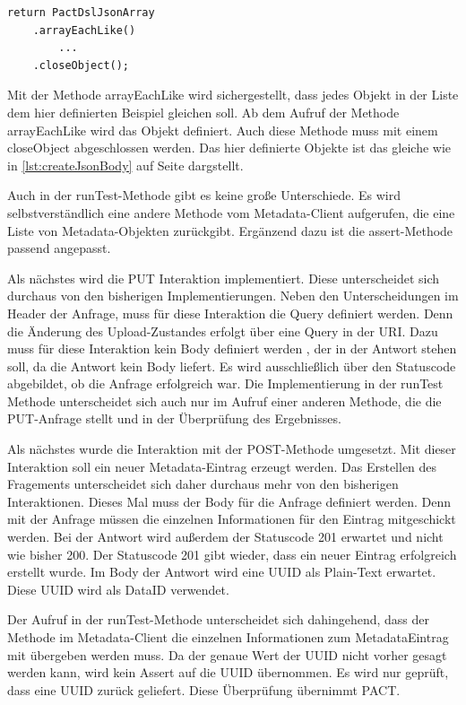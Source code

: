 \documentclass{llncs}
\begin{document}
\lstset{language = Java}
\begin{lstlisting}[caption=Test,label={lst:ArrayBody}]
return PactDslJsonArray
    .arrayEachLike()
        ...
    .closeObject();
\end{lstlisting}

Mit der Methode arrayEachLike wird sichergestellt, dass jedes Objekt in der Liste dem hier definierten Beispiel gleichen soll. Ab dem Aufruf der Methode arrayEachLike wird das Objekt definiert. Auch diese Methode muss mit einem closeObject abgeschlossen werden. Das hier definierte Objekte ist das gleiche wie in \ref{lst:createJsonBody} auf Seite \pageref{lst:createJsonBody} dargstellt.

Auch in der runTest-Methode gibt es keine große Unterschiede. Es wird selbstverständlich eine andere Methode vom Metadata-Client aufgerufen, die eine Liste von Metadata-Objekten zurückgibt. Ergänzend dazu ist die assert-Methode passend angepasst.

Als nächstes wird die PUT Interaktion implementiert. Diese unterscheidet sich durchaus von den bisherigen Implementierungen. Neben den Unterscheidungen im Header der Anfrage, muss für diese Interaktion die Query definiert werden. Denn die Änderung des Upload-Zustandes erfolgt über eine Query in der URI. 
Dazu muss für diese Interaktion kein Body definiert werden , der in der Antwort stehen soll, da die Antwort kein Body liefert. Es wird ausschließlich über den Statuscode abgebildet, ob die Anfrage erfolgreich war.
Die Implementierung in der runTest Methode unterscheidet sich auch nur im Aufruf einer anderen Methode, die die PUT-Anfrage stellt und in der Überprüfung des Ergebnisses.

Als nächstes wurde die Interaktion mit der POST-Methode umgesetzt. Mit dieser Interaktion soll ein neuer Metadata-Eintrag erzeugt werden. Das Erstellen des Fragements unterscheidet sich daher durchaus mehr von den bisherigen Interaktionen. Dieses Mal muss der Body für die Anfrage definiert werden. Denn mit der Anfrage müssen die einzelnen Informationen für den Eintrag mitgeschickt werden. Bei der Antwort wird außerdem der Statuscode 201 erwartet und nicht wie bisher 200. Der Statuscode 201 gibt wieder, dass ein neuer Eintrag erfolgreich erstellt wurde. Im Body der Antwort wird eine UUID als Plain-Text erwartet. Diese UUID wird als DataID verwendet.

Der Aufruf in der runTest-Methode unterscheidet sich dahingehend, dass der Methode im Metadata-Client die einzelnen Informationen zum MetadataEintrag mit übergeben werden muss. Da der genaue Wert der UUID nicht vorher gesagt werden kann, wird kein Assert auf die UUID übernommen. Es wird nur geprüft, dass eine UUID zurück geliefert. Diese Überprüfung übernimmt PACT.
\end{document}
